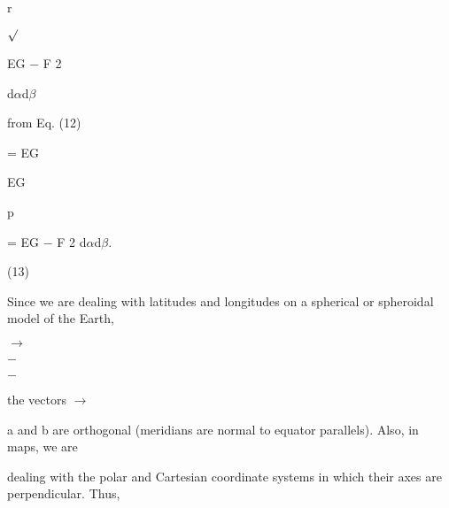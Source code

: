 \documentclass[a4paper,portrait,12pt]{article}
\begin{document}
\begin{flushleft}
r
\end{flushleft}


$\surd$


\begin{flushleft}
EG $-$ F 2
\end{flushleft}


\begin{flushleft}
d$\alpha$d$\beta$
\end{flushleft}


\begin{flushleft}
from Eq. (12)
\end{flushleft}


\begin{flushleft}
= EG
\end{flushleft}


\begin{flushleft}
EG
\end{flushleft}


\begin{flushleft}
p
\end{flushleft}


\begin{flushleft}
= EG $-$ F 2 d$\alpha$d$\beta$.
\end{flushleft}





(13)





\begin{flushleft}
Since we are dealing with latitudes and longitudes on a spherical or spheroidal model of the Earth,
\end{flushleft}


$\rightarrow$


$-$


$-$


\begin{flushleft}
the vectors $\rightarrow$
\end{flushleft}


\begin{flushleft}
a and b are orthogonal (meridians are normal to equator parallels). Also, in maps, we are
\end{flushleft}


\begin{flushleft}
dealing with the polar and Cartesian coordinate systems in which their axes are perpendicular. Thus,
\end{flushleft}
\end{document}
